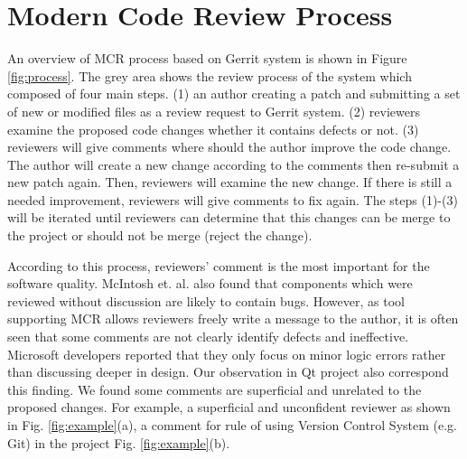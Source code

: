 \documentclass[conference]{IEEEtran}
\begin{document}


\section{Modern Code Review Process}

An overview of MCR process based on Gerrit system is shown in Figure \ref{fig:process}. The grey area shows the review process of the system which composed of four main steps. (1) an author creating a patch and submitting a set of new or modified files as a review request to Gerrit system. (2) reviewers examine the proposed code changes whether it contains defects or not. (3) reviewers will give comments where should the author improve the code change. The author will create a new change according to the comments then re-submit a new patch again. Then, reviewers will examine the new change. If there is still a needed improvement, reviewers will give comments to fix again. The steps (1)-(3) will be iterated until reviewers can determine that this changes can be merge to the project or should not be merge (reject the change). 

According to this process, reviewers' comment is the most important for the software quality. McIntosh et. al. \cite{Mcintosh} also found that components which were reviewed without discussion are likely to contain bugs. However, as tool supporting MCR allows reviewers freely write a message to the author, it is often seen that some comments are not clearly identify defects and ineffective. Microsoft developers reported that they only focus on minor logic errors rather than discussing deeper in design\cite{Bacchelli2013a}. Our observation in Qt project also correspond this finding. We found some comments are superficial and unrelated to the proposed changes. For example, a superficial and unconfident reviewer as shown in Fig. \ref{fig:example}(a), a comment for rule of using Version Control System (e.g. Git) in the project Fig. \ref{fig:example}(b). 
\end{document}
